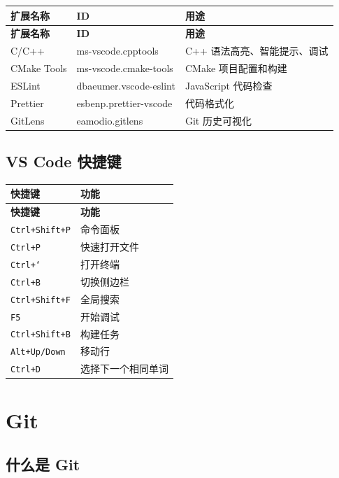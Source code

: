 ﻿\documentclass[12pt,a4paper,oneside]{ctexbook}
\begin{document}
\begin{longtable}{p{4cm}p{3cm}p{6cm}}
    \toprule
    \textbf{扩展名称} & \textbf{ID} & \textbf{用途} \\
    \midrule
    \endfirsthead
    \toprule
    \textbf{扩展名称} & \textbf{ID} & \textbf{用途} \\
    \midrule
    \endhead
    \bottomrule
    \endfoot
    C/C++ & ms-vscode.cpptools & C++ 语法高亮、智能提示、调试 \\
    CMake Tools & ms-vscode.cmake-tools & CMake 项目配置和构建 \\
    ESLint & dbaeumer.vscode-eslint & JavaScript 代码检查 \\
    Prettier & esbenp.prettier-vscode & 代码格式化 \\
    GitLens & eamodio.gitlens & Git 历史可视化 \\
    \bottomrule
\end{longtable}

\subsection{VS Code 快捷键}

\begin{longtable}{p{5cm}p{8cm}}
    \toprule
    \textbf{快捷键} & \textbf{功能} \\
    \midrule
    \endfirsthead
    \toprule
    \textbf{快捷键} & \textbf{功能} \\
    \midrule
    \endhead
    \bottomrule
    \endfoot
    \texttt{Ctrl+Shift+P} & 命令面板 \\
    \texttt{Ctrl+P} & 快速打开文件 \\
    \texttt{Ctrl+`} & 打开终端 \\
    \texttt{Ctrl+B} & 切换侧边栏 \\
    \texttt{Ctrl+Shift+F} & 全局搜索 \\
    \texttt{F5} & 开始调试 \\
    \texttt{Ctrl+Shift+B} & 构建任务 \\
    \texttt{Alt+Up/Down} & 移动行 \\
    \texttt{Ctrl+D} & 选择下一个相同单词 \\
    \bottomrule
\end{longtable}

\section{Git}

\subsection{什么是 Git}
\end{document}

